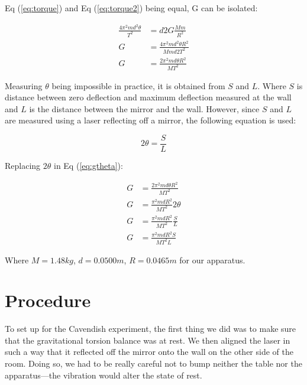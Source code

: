 \documentclass[12pt]{article}
\begin{document}
    Eq (\ref{eq:torque}) and Eq (\ref{eq:torque2}) being equal, G can be isolated:


    \begin{equation}
        \begin{aligned}
            \frac{4\pi^2md^2\theta}{T^2}&=d2G\frac{Mm}{R^2}\\
            G&=\frac{4\pi^2md^2\theta R^2}{Mmd2T^2}\\
            G&=\frac{2\pi^2md\theta R^2}{MT^2}\label{eq:gtheta}
        \end{aligned}
    \end{equation}

    Measuring $\theta$ being impossible in practice, it is obtained from $S$ and $L$. Where $S$ is distance between zero deflection and maximum deflection measured at the wall and $L$ is the distance between the mirror and the wall. However, since $S$ and $L$ are measured using a laser reflecting off a mirror, the following equation is used:

    \begin{equation}
        2\theta = \frac{S}{L}
    \end{equation}

    Replacing $2\theta$ in Eq (\ref{eq:gtheta}):

    \begin{equation}
        \begin{aligned}
            G&=\frac{2\pi^2md\theta R^2}{MT^2}\\
            G&=\frac{\pi^2mdR^2}{MT^2} 2\theta\\
            G&=\frac{\pi^2mdR^2}{MT^2}  \frac{S}{L}\\
            G&=\frac{\pi^2mdR^2S}{MT^2L} \label{eq:final}
        \end{aligned}
    \end{equation}

    Where $M = 1.48kg$, $d = 0.0500m$, $R = 0.0465m$ for our apparatus.
\newpage
\section*{Procedure}

To set up for the Cavendish experiment, the first thing we did was to make sure that the gravitational torsion balance was at rest. We then aligned the laser in such a way that it reflected off the mirror onto the wall on the other side of the room. Doing so, we had to be really careful not to bump neither the table nor the apparatus—the vibration would alter the state of rest.
\end{document}
